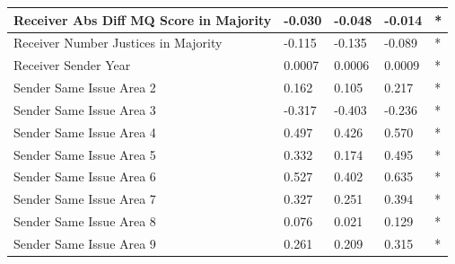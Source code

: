 \documentclass[headsepline=true, abstracton]{scrartcl}
\begin{document}
\begin{table}[H]
\begin{tabular}{|
>{\columncolor[HTML]{EFEFEF}}l |l|l|l|l|}
Receiver Abs Diff MQ Score in Majority             & -0.030                           & -0.048                              & -0.014                              & *                                    \\ \hline
Receiver Number Justices in Majority               & -0.115                           & -0.135                              & -0.089                              & *                                    \\ \hline
Receiver  Sender Year                              & 0.0007                           & 0.0006                              & 0.0009                              & *                                    \\ \hline
Sender Same Issue Area 2                           & 0.162                            & 0.105                               & 0.217                               & *                                    \\ \hline
Sender Same Issue Area 3                           & -0.317                           & -0.403                              & -0.236                              & *                                    \\ \hline
Sender Same Issue Area 4                           & 0.497                            & 0.426                               & 0.570                               & *                                    \\ \hline
Sender Same Issue Area 5                           & 0.332                            & 0.174                               & 0.495                               & *                                    \\ \hline
Sender Same Issue Area 6                           & 0.527                            & 0.402                               & 0.635                               & *                                    \\ \hline
Sender Same Issue Area 7                           & 0.327                            & 0.251                               & 0.394                               & *                                    \\ \hline
Sender Same Issue Area 8                           & 0.076                            & 0.021                               & 0.129                               & *                                    \\ \hline
Sender Same Issue Area 9                           & 0.261                            & 0.209                               & 0.315                               & *                                    \\ \hline

\end{tabular}
\end{table}
\end{document}
